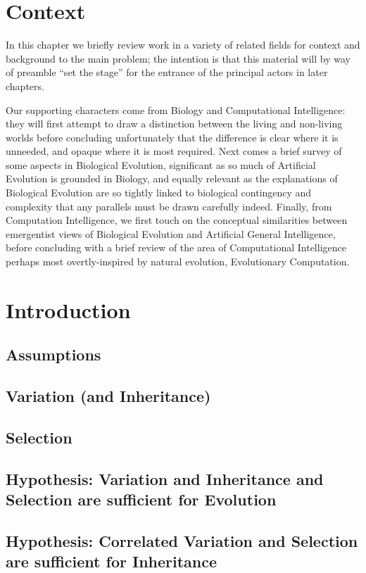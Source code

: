 \documentclass[]{report}
\begin{document}
\chapter{Context}
In this chapter we briefly review work in a variety of related fields for context and background to the main problem; the intention is that this material will by way of preamble ``set the stage'' for the entrance of the principal actors in later chapters.

Our supporting characters come from Biology and Computational Intelligence: they will first attempt to draw a distinction between the living and non-living worlds before concluding unfortunately that the difference is clear where it is unneeded, and opaque where it is most required. Next comes a brief survey of some aspects in Biological Evolution, significant as so much of Artificial Evolution is grounded in Biology, and equally relevant as the explanations of Biological Evolution are so tightly linked to biological contingency and complexity that any parallels must be drawn carefully indeed. Finally, from Computation Intelligence, we first touch on the conceptual similarities between emergentist views of Biological Evolution and Artificial General Intelligence, before concluding with a brief review of the area of Computational Intelligence perhaps most overtly-inspired by natural evolution, Evolutionary Computation.

\chapter{Introduction}\label{part-one}
\section{Assumptions}
\section{Variation (and Inheritance)}
\section{Selection}
\section{Hypothesis: Variation and Inheritance and Selection are sufficient for Evolution}
\section{Hypothesis: Correlated Variation and Selection are sufficient for Inheritance}
\end{document}
